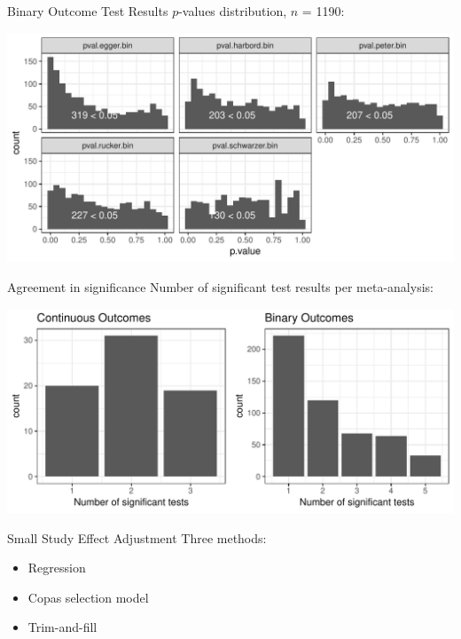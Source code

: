 \documentclass[english]{beamer}\usepackage[]{graphicx}\usepackage[]{color}
\makeatletter
\def\maxwidth{ %
  \ifdim\Gin@nat@width>\linewidth
    \linewidth
  \else
    \Gin@nat@width
  \fi
}
\newenvironment{knitrout}{}{} %
\makeatother
\begin{document}
\begin{frame}[fragile]{Binary Outcome Test Results}
$p$-values distribution, $n$ = 1190:

\vspace{-2mm}
\begin{knitrout}
\color{fgcolor}
\includegraphics[width=\maxwidth]{figure/unnamed-chunk-8-1} 

\end{knitrout}
\end{frame}

\begin{frame}[fragile]{Agreement in significance}
Number of significant test results per meta-analysis:

\vspace{-2mm}
\begin{knitrout}
\color{fgcolor}
\includegraphics[width=\maxwidth]{figure/unnamed-chunk-9-1} 

\end{knitrout}
\end{frame}

\begin{frame}{Small Study Effect Adjustment}
Three methods:
\begin{itemize}
\item Regression
\item Copas selection model
\item Trim-and-fill
\end{itemize}
\end{frame}
\end{document}

